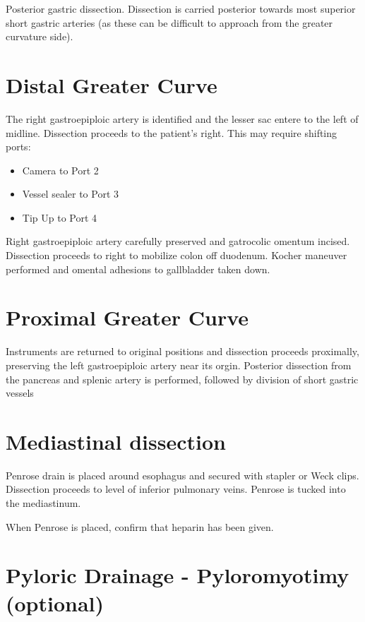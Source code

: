 \documentclass[
  letterpaper,
]{scrbook}
\providecommand{\tightlist}{%
  \setlength{\itemsep}{0pt}\setlength{\parskip}{0pt}}
\begin{document}
Posterior gastric dissection. Dissection is carried posterior towards
most superior short gastric arteries (as these can be difficult to
approach from the greater curvature side).

\section{Distal Greater Curve}\label{distal-greater-curve}

The right gastroepiploic artery is identified and the lesser sac entere
to the left of midline. Dissection proceeds to the patient's right. This
may require shifting ports:

\begin{itemize}
\tightlist
\item
  Camera to Port 2
\item
  Vessel sealer to Port 3
\item
  Tip Up to Port 4
\end{itemize}

Right gastroepiploic artery carefully preserved and gatrocolic omentum
incised. Dissection proceeds to right to mobilize colon off duodenum.
Kocher maneuver performed and omental adhesions to gallbladder taken
down.

\section{Proximal Greater Curve}\label{proximal-greater-curve}

Instruments are returned to original positions and dissection proceeds
proximally, preserving the left gastroepiploic artery near its orgin.
Posterior dissection from the pancreas and splenic artery is performed,
followed by division of short gastric vessels

\section{Mediastinal dissection}\label{mediastinal-dissection-1}

Penrose drain is placed around esophagus and secured with stapler or
Weck clips. Dissection proceeds to level of inferior pulmonary veins.
Penrose is tucked into the mediastinum.

When Penrose is placed, confirm that heparin has been given.

\section{Pyloric Drainage - Pyloromyotimy
(optional)}\label{pyloric-drainage---pyloromyotimy-optional}
\end{document}
